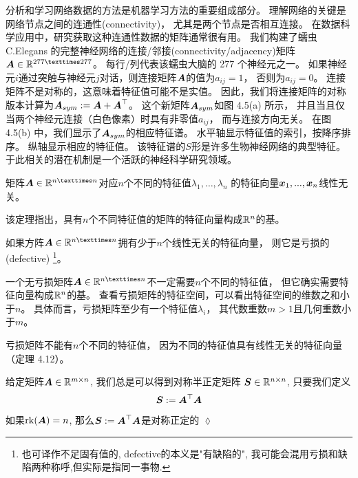 \begin{example}[生物神经网络的特征谱]
分析和学习网络数据的方法是机器学习方法的重要组成部分。
理解网络的关键是网络节点之间的连通性(connectivity)，
尤其是两个节点是否相互连接。
在数据科学应用中，研究获取这种连通性数据的矩阵通常很有用。
我们构建了蠕虫 C.Elegans 的完整神经网络的连接/邻接(connectivity/adjacency)矩阵$\A \in \R^{277×277}$。
每行/列代表该蠕虫大脑的 277 个神经元之一。
如果神经元$i$通过突触与神经元$j$对话，则连接矩阵$\boldsymbol{A}$的值为$a_{ij} = 1$，
否则为$a_{ij} = 0$。
连接矩阵不是对称的，这意味着特征值可能不是实值。
因此，我们将连接矩阵的对称版本计算为$\boldsymbol{A}_{sym} := \boldsymbol{A} + \boldsymbol{A}^\top$。
这个新矩阵$\boldsymbol{A}_{sym}$如图 4.5(a) 所示，
并且当且仅当两个神经元连接（白色像素）时具有非零值$a_{ij}$，
而与连接方向无关。
在图 4.5(b) 中，我们显示了$\boldsymbol{A}_{sym}$的相应特征谱。
水平轴显示特征值的索引，按降序排序。
纵轴显示相应的特征值。
该特征谱的$S$形是许多生物神经网络的典型特征。
于此相关的潜在机制是一个活跃的神经科学研究领域。
\end{example}

\begin{theorem}
    矩阵$\A \in \R^{n×n}$对应$n$个不同的特征值$\lambda_1, \dots, \lambda_n$
    的特征向量$\boldsymbol{x}_1, . . . , \boldsymbol{x}_n$线性无关。
\end{theorem}

该定理指出，具有$n$个不同特征值的矩阵的特征向量构成$\mathbb{R}^n$的基。

\begin{definition}
    如果方阵$\A \in \R^{n×n}$拥有少于$n$个线性无关的特征向量，
    则它是亏损的(defective)
    \footnote{
        也可译作不足固有值的,
        defective的本义是"有缺陷的", 我可能会混用亏损和缺陷两种称呼,但实际是指同一事物.
    }。
\end{definition}

一个无亏损矩阵$\A \in \R^{n×n}$不一定需要$n$个不同的特征值，
但它确实需要特征向量构成$\mathbb{R}^n$的基。
查看亏损矩阵的特征空间，可以看出特征空间的维数之和小于$n$。
具体而言，亏损矩阵至少有一个特征值$\lambda_i$，
其代数重数$m > 1$且几何重数小于$m$。

\begin{remark}
    亏损矩阵不能有$n$个不同的特征值，
    因为不同的特征值具有线性无关的特征向量（定理 4.12）。
\end{remark}

\begin{theorem}
    给定矩阵$\boldsymbol{A} \in \mathbb{R}^{m \times n}$, 我们总是可以得到对称半正定矩阵
    $\boldsymbol{S} \in \mathbb{R}^{n \times n}$, 只要我们定义
    \begin{equation}
        \boldsymbol{S} := \boldsymbol{A}^\top\boldsymbol{A}
    \end{equation}
\end{theorem}
\begin{remark}
    如果$\mathrm{rk}(\boldsymbol{A}) = n$, 那么$\boldsymbol{S} := \boldsymbol{A}^\top\boldsymbol{A}$是对称正定的
    \hfill $\lozenge$
\end{remark}

